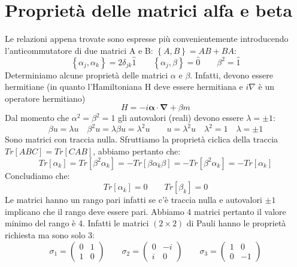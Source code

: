 \section{Proprietà delle matrici alfa e beta}
Le relazioni appena trovate sono espresse più convenientemente introducendo l'anticommutatore di due matrici A e B: $\left\{A,B\right\}=AB+BA$:
\begin{equation}
    \left\{\alpha_j,\alpha_k\right\}=2\delta_{jk}\hat{1}\qquad \left\{\alpha_j,\beta\right\}=\hat{0} \qquad \beta^2=\hat{1}
\end{equation}
Determiniamo alcune proprietà delle matrici $\alpha$ e $\beta$. Infatti, devono essere hermitiane (in quanto l'Hamiltoniana H deve essere hermitiana e $i\nabla$ è un operatore hermitiano)
\begin{equation*}
    H=-i\boldsymbol{\alpha}\cdot\mathbf{\nabla}+\beta m
\end{equation*}
Dal momento che $\alpha^2=\beta^2=1$ gli autovalori (reali) devono essere $\lambda=\pm1$:
\begin{equation*}
    \beta u=\lambda u \quad \beta^2u=\lambda\beta u=\lambda^2u \qquad u=\lambda^2u \quad \lambda^2=1 \quad \lambda=\pm1
\end{equation*}
Sono matrici con traccia nulla. Sfruttiamo la proprietà ciclica della traccia $Tr\left[ABC\right]=Tr\left[CAB\right]$, abbiamo pertanto che:
\begin{equation*}
    Tr[\alpha_k]=Tr\left[\beta^2\alpha_k\right]=-Tr\left[\beta\alpha_k\beta\right]=-Tr\left[\beta^2\alpha_k\right]=-Tr\left[\alpha_k\right]
\end{equation*}
Concludiamo che:
\begin{equation*}
    Tr\left[\alpha_k\right]=0 \qquad Tr\left[\beta_k\right]=0 
\end{equation*}
Le matrici hanno un rango pari infatti se c'è traccia nulla e autovalori $\pm1$ implicano che il rango deve essere pari. Abbiamo 4 matrici pertanto il valore minimo del rango è 4. Infatti le matrici $(2\times2)$ di Pauli hanno le proprietà richiesta ma sono solo 3:
\begin{equation*}
    \sigma_1 = \begin{pmatrix} 0 & 1 \\ 1 & 0 \end{pmatrix} \qquad \sigma_2 = \begin{pmatrix} 0 & -i \\ i & 0 \end{pmatrix} \qquad \sigma_3 = \begin{pmatrix} 1 & 0 \\ 0 & -1 \end{pmatrix}
\end{equation*}
